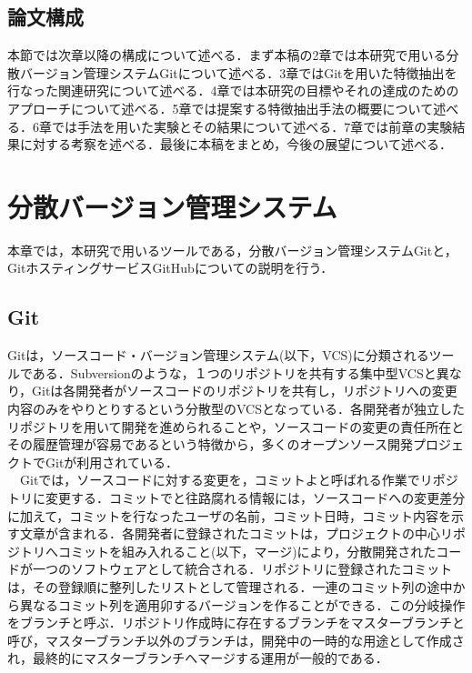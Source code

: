 \documentclass{funthesis}
\begin{document}
\section{論文構成}
本節では次章以降の構成について述べる．まず本稿の2章では本研究で用いる分散バージョン管理システムGitについて述べる．3章ではGitを用いた特徴抽出を行なった関連研究について述べる．4章では本研究の目標やそれの達成のためのアプローチについて述べる．5章では提案する特徴抽出手法の概要について述べる．6章では手法を用いた実験とその結果について述べる．7章では前章の実験結果に対する考察を述べる．最後に本稿をまとめ，今後の展望について述べる．


\chapter{分散バージョン管理システム} %

本章では，本研究で用いるツールである，分散バージョン管理システムGitと，GitホスティングサービスGitHubについての説明を行う．


\section{Git} %


Gitは，ソースコード・バージョン管理システム(以下，VCS)に分類されるツールである．Subversionのような，１つのリポジトリを共有する集中型VCSと異なり，Gitは各開発者がソースコードのリポジトリを共有し，リポジトリへの変更内容のみをやりとりするという分散型のVCSとなっている．各開発者が独立したリポジトリを用いて開発を進められることや，ソースコードの変更の責任所在とその履歴管理が容易であるという特徴から，多くのオープンソース開発プロジェクトでGitが利用されている．
\\　Gitでは，ソースコードに対する変更を，コミットよと呼ばれる作業でリポジトリに変更する．コミットでと往路腐れる情報には，ソースコードへの変更差分に加えて，コミットを行なったユーザの名前，コミット日時，コミット内容を示す文章が含まれる．各開発者に登録されたコミットは，プロジェクトの中心リポジトリへコミットを組み入れること(以下，マージ)により，分散開発されたコードが一つのソフトウェアとして統合される．リポジトリに登録されたコミットは，その登録順に整列したリストとして管理される．一連のコミット列の途中から異なるコミット列を適用卯するバージョンを作ることができる．この分岐操作をブランチと呼ぶ．リポジトリ作成時に存在するブランチをマスターブランチと呼び，マスターブランチ以外のブランチは，開発中の一時的な用途として作成され，最終的にマスターブランチへマージする運用が一般的である\cite{Matsubara}．
\end{document}
